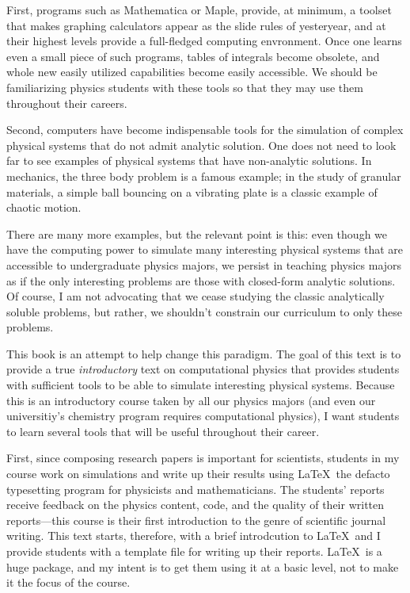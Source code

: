 First, programs such as Mathematica or Maple, provide, at minimum, a toolset that makes graphing calculators appear as the slide rules of yesteryear, and at their highest levels provide a full-fledged computing envronment. Once one learns even a small piece of such programs, tables of integrals become obsolete, and whole new easily utilized capabilities become easily accessible. We should be familiarizing physics students with these tools so that they may use them throughout their careers. 

Second, computers have become indispensable tools for the simulation of complex physical systems that do not admit analytic solution. One does not need to look far to see examples of physical systems that have non-analytic solutions. In mechanics, the three body problem is a famous example; in the study of granular materials, a simple ball bouncing on a vibrating plate is a classic example of chaotic motion. 

There are many more examples, but the relevant point is this: even though we have the computing power to simulate many interesting physical systems that are accessible to undergraduate physics majors, we persist in teaching physics majors as if the only interesting problems are those with closed-form analytic solutions. Of course, I am not advocating that we cease studying the classic analytically soluble problems, but rather, we shouldn't constrain our curriculum to only these problems. 

This book is an attempt to help change this paradigm. The goal of this text is to provide a true \textit{introductory} text on computational physics that provides students with sufficient tools to be able to simulate interesting physical systems. Because this is an introductory course taken by all our physics majors (and even our universitiy's chemistry program requires computational physics), I want students to learn several tools that will be useful throughout their career.

First, since composing research papers is important for scientists, students in my course work on simulations and write up their results using \LaTeX\, the defacto typesetting program for physicists and mathematicians. The students' reports receive feedback on the physics content, code, and the quality of their written reports---this course is their first introduction to the genre of scientific journal writing. This text starts, therefore, with a brief introdcution to \LaTeX\ and I provide students with a template file for writing up their reports. \LaTeX\ is a huge package, and my intent is to get them using it at a basic level, not to make it the focus of the course. 

